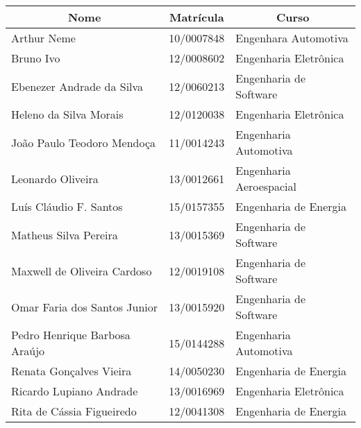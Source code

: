 \begin{resumo}[Autores]

\begin{table}[!h]
\centering
\label{my-label}
\begin{tabular}{|l|l|l|}
\hline
\multicolumn{1}{|c|}{\textbf{Nome}}    & \multicolumn{1}{c|}{\textbf{Matrícula}} & \multicolumn{1}{c|}{\textbf{Curso}} \\ \hline
Arthur Neme        					   & 10/0007848                              & Engenhara Automotiva                \\ \hline
Bruno Ivo        					   & 12/0008602                              & Engenharia Eletrônica                \\ \hline
Ebenezer Andrade da Silva              & 12/0060213                              & Engenharia de Software             \\ \hline
Heleno da Silva Morais                 & 12/0120038                              & Engenharia Eletrônica               \\ \hline
João Paulo Teodoro Mendoça             & 11/0014243                              & Engenharia Automotiva             \\ \hline
Leonardo Oliveira             		   & 13/0012661                              & Engenharia Aeroespacial             \\ \hline
Luís Cláudio F. Santos             	   & 15/0157355                              & Engenharia de Energia             \\ \hline
Matheus Silva Pereira             	   & 13/0015369                              & Engenharia de Software             \\ \hline
Maxwell de Oliveira Cardoso            & 12/0019108                              & Engenharia de Software             \\ \hline
Omar Faria dos Santos Junior           & 13/0015920                              & Engenharia de Software             \\ \hline
Pedro Henrique Barbosa Araújo          & 15/0144288                              & Engenharia Automotiva             \\ \hline
Renata Gonçalves Vieira                & 14/0050230                              & Engenharia de Energia             \\ \hline
Ricardo Lupiano Andrade                & 13/0016969                              & Engenharia Eletrônica             \\ \hline
Rita de Cássia Figueiredo               & 12/0041308                              & Engenharia de Energia             \\ \hline
\end{tabular}
\end{table}

\end{resumo}
\pagebreak

